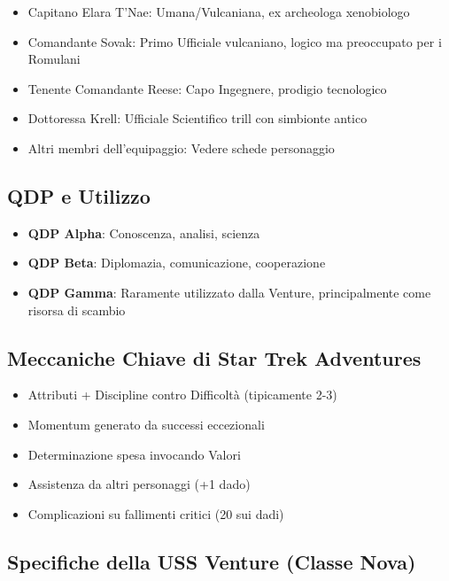 \documentclass[letterpaper,twocolumn,openany,nodeprecatedcode]{dndbook}
\begin{document}
\begin{itemize}
    \item Capitano Elara T'Nae: Umana/Vulcaniana, ex archeologa xenobiologo
    \item Comandante Sovak: Primo Ufficiale vulcaniano, logico ma preoccupato per i Romulani
    \item Tenente Comandante Reese: Capo Ingegnere, prodigio tecnologico
    \item Dottoressa Krell: Ufficiale Scientifico trill con simbionte antico
    \item Altri membri dell'equipaggio: Vedere schede personaggio
\end{itemize}

\subsection{QDP e Utilizzo}

\begin{itemize}
    \item \textbf{QDP Alpha}: Conoscenza, analisi, scienza
    \item \textbf{QDP Beta}: Diplomazia, comunicazione, cooperazione
    \item \textbf{QDP Gamma}: Raramente utilizzato dalla Venture, principalmente come risorsa di scambio
\end{itemize}

\subsection{Meccaniche Chiave di Star Trek Adventures}

\begin{itemize}
    \item Attributi + Discipline contro Difficoltà (tipicamente 2-3)
    \item Momentum generato da successi eccezionali
    \item Determinazione spesa invocando Valori
    \item Assistenza da altri personaggi (+1 dado)
    \item Complicazioni su fallimenti critici (20 sui dadi)
\end{itemize}

\subsection{Specifiche della USS Venture (Classe Nova)}
\end{document}
